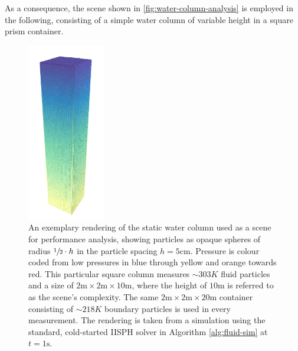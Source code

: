 \documentclass[oneside, a4paper]{book}
\begin{document}
  As a consequence, the scene shown in \autoref{fig:water-column-analysis} is employed in the following, consisting of a simple water column of variable height in a square prism container.

  \begin{figure}
    \centering
    \includegraphics[width=0.3\textwidth]{images/water_column_10m.png}
    \caption{An exemplary rendering of the static water column used as a scene for performance analysis, showing particles as opaque spheres of radius $\sfrac{1}{2}\cdot h$ in the particle spacing $h=5\text{cm}$. Pressure is colour coded from low pressures in blue through yellow and orange towards red. This particular square column measures $\sim 303K$ fluid particles and a size of $2\text{m}\times 2\text{m}\times 10\text{m}$, where the height of $10\text{m}$ is referred to as the scene's complexity. The same $2\text{m}\times 2\text{m}\times 20\text{m}$ container consisting of $\sim 218K$ boundary particles is used in every measurement. The rendering is taken from a simulation using the standard, cold-started IISPH solver in Algorithm \ref{alg:fluid-sim} at $t=1\text{s}$.}
    \label{fig:water-column-analysis}
  \end{figure}
\end{document}
